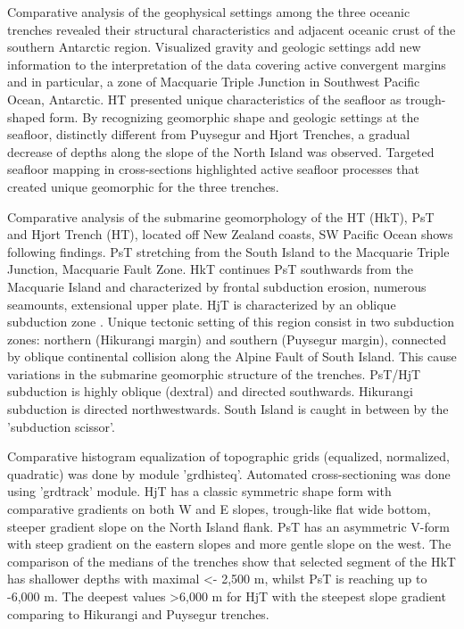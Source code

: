 \documentclass[11pt,a4paper]{report}
\begin{document}
{Comparative analysis of the geophysical settings among the three oceanic trenches revealed their structural characteristics and adjacent oceanic crust of the southern Antarctic region. Visualized gravity and geologic settings add new information to the interpretation of the data covering active convergent margins and in particular, a zone of Macquarie Triple Junction in Southwest Pacific Ocean, Antarctic. \ac{HT} presented unique characteristics of the seafloor as trough-shaped form. By recognizing geomorphic shape and geologic settings at the seafloor, distinctly different from Puysegur and Hjort Trenches, a gradual decrease of depths along the slope of the North Island was observed. Targeted seafloor mapping in cross-sections highlighted active seafloor processes that created unique geomorphic for the three trenches. 

Comparative analysis of the submarine geomorphology of the \ac{HT} (HkT), \ac{PsT} and Hjort Trench (HT), located off New Zealand coasts, SW Pacific Ocean shows following findings. \ac{PsT} stretching from the South Island to the Macquarie Triple Junction, Macquarie Fault Zone. HkT continues \ac{PsT} southwards from the Macquarie Island and characterized by frontal subduction erosion, numerous seamounts, extensional upper plate. HjT is characterized by an oblique subduction zone \cite{Lemenkova202031}. Unique tectonic setting of this region consist in two subduction zones: northern (Hikurangi margin) and southern (Puysegur margin), connected by oblique continental collision along the Alpine Fault of South Island. This cause variations in the submarine geomorphic structure of the trenches. \ac{PsT}/HjT subduction is highly oblique (dextral) and directed southwards. Hikurangi subduction is directed northwestwards. South Island is caught in between by the 'subduction scissor'. 

Comparative histogram equalization of topographic grids (equalized, normalized, quadratic) was done by module ’grdhisteq’. Automated cross-sectioning was done using ’grdtrack’ module. HjT has a classic symmetric shape form with comparative gradients on both W and E slopes, trough-like flat wide bottom, steeper gradient slope on the North Island flank. \ac{PsT} has an asymmetric V-form with steep gradient on the eastern slopes and more gentle slope on the west. The comparison of the medians of the trenches show that selected segment of the HkT has shallower depths with maximal <- 2,500 m, whilst \ac{PsT} is reaching up to -6,000 m. The deepest values >6,000 m for HjT with the steepest slope gradient comparing to Hikurangi and Puysegur trenches.

}
\end{document}
